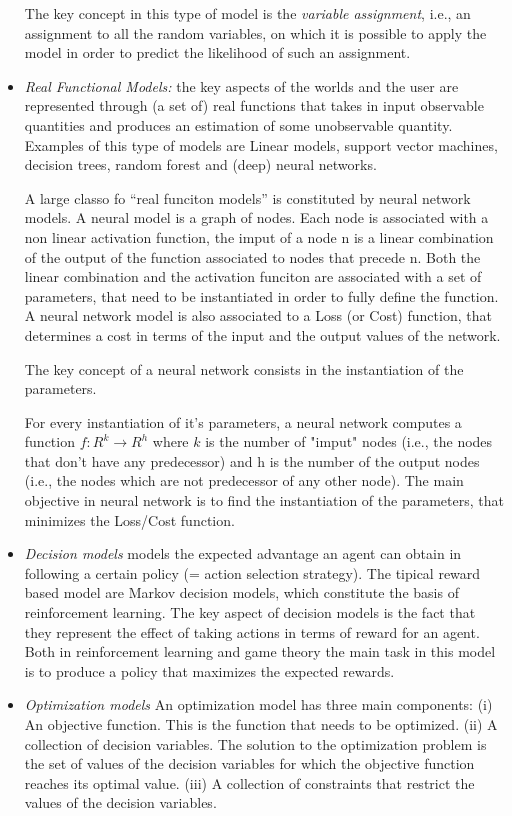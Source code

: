 \begin{itemize}
The key concept in this type of model is the \emph{variable assignment},
i.e., an assignment to all the random variables, on which it is
possible to apply the model in order to predict the likelihood of such
an assignment.

\item \emph{Real Functional Models:} the key aspects of the worlds and
  the user are represented through (a set of) real functions that
  takes in input observable quantities and produces an estimation of
  some unobservable quantity. Examples of this type of models are
  Linear models, support vector machines, decision trees, random
  forest and (deep) neural networks.

  A large classo fo ``real funciton models'' is constituted by neural
  network models. A neural model is a graph of nodes. Each node is
  associated with a non linear activation function, the imput of a
  node n is a linear combination of the output of the function
  associated to nodes that precede n. Both the linear combination and
  the activation funciton are associated with a set of parameters,
  that need to be instantiated in order to fully define the
  function. A neural network model is also associated to a Loss (or
  Cost) function, that determines a cost in terms of the input and the
  output values of the network.

  The key concept of a neural network consists in the instantiation of the parameters.

  For every instantiation of it's parameters, a neural network
  computes a function $f:R^k\rightarrow R^h$ where $k$ is the number
  of "imput" nodes (i.e., the nodes that don't have any predecessor)
  and h is the number of the output nodes (i.e., the nodes which are
  not predecessor of any other node). The main objective in neural
  network is to find the instantiation of the parameters, that
  minimizes the Loss/Cost function.

\item \emph{Decision models} models the expected advantage an agent
  can obtain in following a certain policy (= action selection
  strategy). The tipical reward based model are Markov decision
  models, which constitute the basis of reinforcement learning. The
  key aspect of decision models is the fact that they represent the
  effect of taking actions in terms of reward for an agent. Both in
  reinforcement learning and game theory the main task in this model
  is to produce a policy that maximizes the expected rewards.

\item \emph{Optimization models} An optimization model has three main
  components: (i) An objective function. This is the function that
  needs to be optimized. (ii) A collection of decision variables. The
  solution to the optimization problem is the set of values of the
  decision variables for which the objective function reaches its
  optimal value. (iii) A collection of constraints that restrict the
  values of the decision variables.


\end{itemize}

